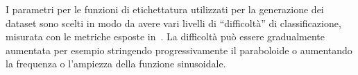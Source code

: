 I parametri per le funzioni di etichettatura utilizzati per la generazione dei dataset sono scelti in modo da avere vari livelli di ``difficoltà'' di classificazione, misurata con le metriche esposte in~.
La difficoltà può essere gradualmente aumentata per esempio stringendo progressivamente il paraboloide o aumentando la frequenza o l'ampiezza della funzione sinusoidale.


